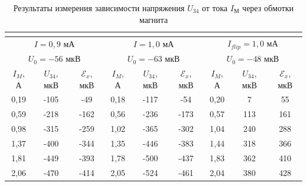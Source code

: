 \documentclass[a4paper, 12pt]{article}
\begin{document}
\begin{table}[H]
\begin{tabular}{ccccccccc}
        \multicolumn{1}{l}{} & \multicolumn{1}{l}{} & \multicolumn{1}{l}{} & \multicolumn{1}{l}{} & \multicolumn{1}{l}{} & \multicolumn{1}{l}{} & \multicolumn{1}{l}{} & \multicolumn{1}{l}{} & \multicolumn{1}{l}{} \\ \hline
        \multicolumn{3}{|c|}{$I = 0,9$ мА} & \multicolumn{3}{c|}{$I = 1,0$ мА} & \multicolumn{3}{c|}{$I_{flip} = 1,0$ мА} \\ \hline
        \multicolumn{3}{|c|}{$U_0 = -56$ мкВ} & \multicolumn{3}{c|}{$U_0 = -63$ мкВ} & \multicolumn{3}{c|}{$U_0 = -48$ мкВ} \\ \hline
        \multicolumn{1}{|c|}{$I_M$, А} & \multicolumn{1}{c|}{$U_{34}$, мкВ} & \multicolumn{1}{c|}{$\mathcal{E}_x$, мкВ} & \multicolumn{1}{c|}{$I_M$, А} & \multicolumn{1}{c|}{$U_{34}$, мкВ} & \multicolumn{1}{c|}{$\mathcal{E}_x$, мкВ} & \multicolumn{1}{c|}{$I_M$, А} & \multicolumn{1}{c|}{$U_{34}$, мкВ} & \multicolumn{1}{c|}{$\mathcal{E}_x$, мкВ} \\ \hline
        \multicolumn{1}{|c|}{0,19} & \multicolumn{1}{c|}{-105} & \multicolumn{1}{c|}{-49} & \multicolumn{1}{c|}{0,18} & \multicolumn{1}{c|}{-117} & \multicolumn{1}{c|}{-54} & \multicolumn{1}{c|}{0,20} & \multicolumn{1}{c|}{7} & \multicolumn{1}{c|}{55} \\ \hline
        \multicolumn{1}{|c|}{0,59} & \multicolumn{1}{c|}{-218} & \multicolumn{1}{c|}{-162} & \multicolumn{1}{c|}{0,56} & \multicolumn{1}{c|}{-236} & \multicolumn{1}{c|}{-173} & \multicolumn{1}{c|}{0,57} & \multicolumn{1}{c|}{113} & \multicolumn{1}{c|}{161} \\ \hline
        \multicolumn{1}{|c|}{0,98} & \multicolumn{1}{c|}{-315} & \multicolumn{1}{c|}{-259} & \multicolumn{1}{c|}{1,02} & \multicolumn{1}{c|}{-365} & \multicolumn{1}{c|}{-302} & \multicolumn{1}{c|}{1,04} & \multicolumn{1}{c|}{240} & \multicolumn{1}{c|}{288} \\ \hline
        \multicolumn{1}{|c|}{1,37} & \multicolumn{1}{c|}{-400} & \multicolumn{1}{c|}{-344} & \multicolumn{1}{c|}{1,35} & \multicolumn{1}{c|}{-446} & \multicolumn{1}{c|}{-383} & \multicolumn{1}{c|}{1,44} & \multicolumn{1}{c|}{318} & \multicolumn{1}{c|}{366} \\ \hline
        \multicolumn{1}{|c|}{1,81} & \multicolumn{1}{c|}{-449} & \multicolumn{1}{c|}{-393} & \multicolumn{1}{c|}{1,78} & \multicolumn{1}{c|}{-500} & \multicolumn{1}{c|}{-437} & \multicolumn{1}{c|}{1,83} & \multicolumn{1}{c|}{362} & \multicolumn{1}{c|}{410} \\ \hline
        \multicolumn{1}{|c|}{2,06} & \multicolumn{1}{c|}{-470} & \multicolumn{1}{c|}{-414} & \multicolumn{1}{c|}{2,05} & \multicolumn{1}{c|}{-524} & \multicolumn{1}{c|}{-461} & \multicolumn{1}{c|}{2,04} & \multicolumn{1}{c|}{380} & \multicolumn{1}{c|}{428} \\ \hline
        \end{tabular}
        \caption{Результаты измерения зависимости напряжения $U_{34}$ от тока $I_\text{М}$ через обмотки магнита}
        \label{measurement_EMF_1}
    \end{table}
\end{document}
